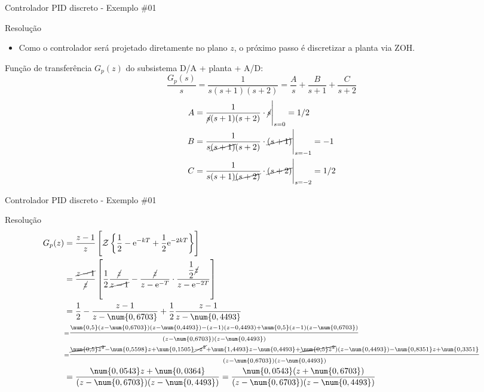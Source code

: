 \begin{frame}{Controlador PID discreto - Exemplo \#01}
\begin{block}{Resolução}
\begin{itemize}
    \item Como o controlador será projetado diretamente no plano $z$, o próximo passo é discretizar a planta via ZOH.
\end{itemize}
	Função de transferência $ G_p(z) $ do subsistema D/A + planta + A/D:
	\[ \dfrac{G_p(s)}{s}=\dfrac{1}{s(s+1)(s+2)}=\dfrac{A}{s}+\dfrac{B}{s+1}+\dfrac{C}{s+2} \]
\vspace{-0.5cm}
	\begin{align*}
		A&=\eval{\dfrac{1}{\cancel{s}(s+1)(s+2)}\cdot\cancel{s}}_{s=0}=1/2\\
		B&=\eval{\dfrac{1}{s\cancel{(s+1)}(s+2)}\cdot\cancel{(s+1)}}_{s=-1}=-1 \\
		C&=\eval{\dfrac{1}{s(s+1)\cancel{(s+2)}}\cdot\cancel{(s+2)}}_{s=-2}=1/2
	\end{align*}
\end{block}
\end{frame}


\begin{frame}{Controlador PID discreto - Exemplo \#01}
\begin{block}{Resolução}
	\begin{align*}
		G_p(z)&=\dfrac{z-1}{z}\left[ \mathcal{Z}\left\lbrace \dfrac{1}{2}-\text{e}^{-kT}+\dfrac{1}{2}\text{e}^{-2kT} \right\rbrace \right]\\
		&=\dfrac{\cancel{z-1}}{\cancel{z}}\left[\dfrac{1}{2}\dfrac{\cancel{z}}{\cancel{z-1}}-\dfrac{\cancel{z}}{z-\text{e}^{-T}}\cdot\dfrac{\dfrac{1}{2}\cancel{z}}{z-\text{e}^{-2T}} \right]\\
		&=\dfrac{1}{2}-\dfrac{z-1}{z-\num{0,6703}}+\dfrac{1}{2}\dfrac{z-1}{z-\num{0,4493}}\\
		&{\scriptstyle
			=\dfrac{\scriptstyle\num{0,5}(z-\num{0,6703})(z-\num{0,4493})-(z-1)(z-0,4493)+\num{0,5}(z-1)(z-\num{0,6703})}{\scriptstyle(z-\num{0,6703})(z-\num{0,4493})}} \\
		&{\scriptstyle
		=\dfrac{\scriptstyle\cancel{\num{0,5}z^{2}}-\num{0,5598}z+\num{0,1505}\cancel{-z^{2}}+\num{1,4493}z-\num{0,4493}+\cancel{\num{0,5}z^{2}})(z-\num{0,4493})-\num{0,8351}z+\num{0,3351}}{\scriptstyle(z-\num{0,6703})(z-\num{0,4493})}}\\
		&=\dfrac{\num{0,0543}z+\num{0,0364}}{(z-\num{0,6703})(z-\num{0,4493})}=\dfrac{\num{0,0543}(z+\num{0,6703})}{(z-\num{0,6703})(z-\num{0,4493})}
	\end{align*}
\end{block}
\end{frame}



